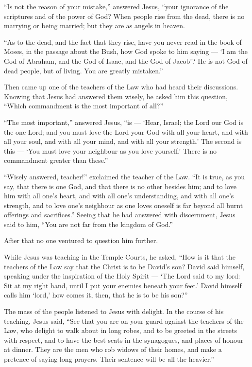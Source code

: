  ``Is not the reason of your mistake,'' answered Jesus,
``your ignorance of the scriptures and of the power of God?
 When people rise from the dead, there is no marrying or
being married; but they are as angels in heaven.

 ``As to the dead, and the fact that they rise, have you
never read in the book of Moses, in the passage about the Bush, how God
spoke to him saying --- `I am the God of Abraham, and the God of Isaac,
and the God of Jacob'?  He is not God of dead people, but
of living. You are greatly mistaken.''

 Then came up one of the teachers of the Law who had heard
their discussions. Knowing that Jesus had answered them wisely, he asked
him this question, ``Which commandment is the most important of all?''

 ``The most important,'' answered Jesus, ``is --- `Hear,
Israel; the Lord our God is the one Lord;  and you must
love the Lord your God with all your heart, and with all your soul, and
with all your mind, and with all your strength.'  The
second is this --- `You must love your neighbour as you love yourself.'
There is no commandment greater than these.''

 ``Wisely answered, teacher!'' exclaimed the teacher of the
Law. ``It is true, as you say, that there is one God, and that there is
no other besides him;  and to love him with all one's
heart, and with all one's understanding, and with all one's strength,
and to love one's neighbour as one loves oneself is far beyond all burnt
offerings and sacrifices.''  Seeing that he had answered
with discernment, Jesus said to him, ``You are not far from the kingdom
of God.''

After that no one ventured to question him further.

 While Jesus was teaching in the Temple Courts, he asked,
``How is it that the teachers of the Law say that the Christ is to be
David's son?  David said himself, speaking under the
inspiration of the Holy Spirit --- `The Lord said to my lord: Sit at my
right hand, until I put your enemies beneath your feet.' 
David himself calls him `lord,' how comes it, then, that he is to be his
son?''

The mass of the people listened to Jesus with delight.  In
the course of his teaching, Jesus said, ``See that you are on your guard
against the teachers of the Law, who delight to walk about in long
robes, and to be greeted in the streets with respect,  and
to have the best seats in the synagogues, and places of honour at
dinner.  They are the men who rob widows of their homes,
and make a pretence of saying long prayers. Their sentence will be all
the heavier.''

